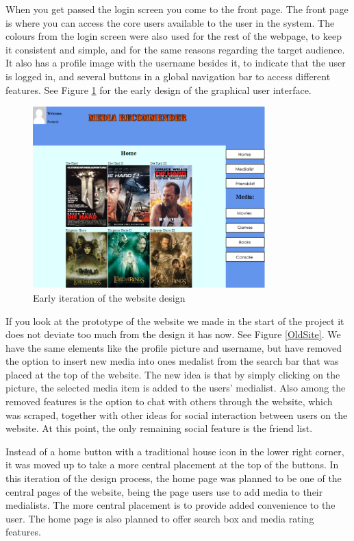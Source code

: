 When you get passed the login screen you come to the front page. The front page is where you can access the core users available to the user in the system. The colours from the login screen were also used for the rest of the webpage, to keep it consistent and simple, and for the same reasons regarding the target audience. It also has a profile image with the username besides it, to indicate that the user is logged in, and several buttons in a global navigation bar to access different features. See Figure \ref{CurrSite} for the early design of the graphical user interface.

\begin{figure}[htb]
\centering
\includegraphics[width=0.8\textwidth]{Images/CurrSite.png}
\caption{Early iteration of the website design}
\label{CurrSite}
\end{figure}


If you look at the prototype of the website we made in the start of the project it does not deviate too much from the design it has now. See Figure \ref{OldSite}. We have the same elements like the profile picture and username, but have removed the option to insert new media into ones medalist from the search bar that was placed at the top of the website. The new idea is that by simply clicking on the picture, the selected media item is added to the users’ medialist. Also among the removed features is the option to chat with others through the website, which was scraped, together with other ideas for social interaction between users on the website. At this point, the only remaining social feature is the friend list. 

Instead of a home button with a traditional house icon in the lower right corner, it was moved up to take a more central placement at the top of the buttons. In this iteration of the design process, the home page was planned to be one of the central pages of the website, being the page users use to add media to their medialists. The more central placement is to provide added convenience to the user. The home page is also planned to offer search box and media rating features.

